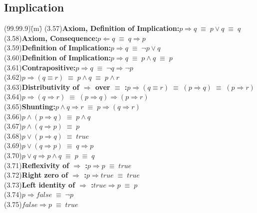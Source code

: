 \documentclass{amsart}
\newcommand{\lgap}{2pt}                             %
\newcommand{\equivs}{\ensuremath{\;\equiv\;}}       %
\newcommand{\impl}{\ensuremath{\Rightarrow}}        %
\newcommand{\foll}{\ensuremath{\Leftarrow}}         %
\begin{document}
\subsection*{Implication}
\begin{tabbing}
(99.99.9)\;\=(m)\;\=\kill
(3.57)\>\textbf{Axiom, Definition of Implication:}\quad $p\impl q \equivs p\lor q \equivs q$\\[\lgap]
(3.58)\>\textbf{Axiom, Consequence:}\quad $p\foll q \equivs q\impl p$\\[\lgap]
(3.59)\>\textbf{Definition of Implication:}\quad $p\impl q \equivs \neg p \lor q$\\[\lgap]
(3.60)\>\textbf{Definition of Implication:}\quad $p\impl q \equivs p\land q \equivs p$\\[\lgap]
(3.61)\>\textbf{Contrapositive:}\quad $p\impl q \equivs \neg q\impl \neg p$\\[\lgap]
(3.62)\>$p\impl (q\equiv r) \equivs p\land q\equivs p\land r$\\[\lgap]
(3.63)\>\textbf{Distributivity of $\impl$ over $\equiv$ :}\quad $p\impl (q\equiv r)\equivs (p\impl q)\equivs (p\impl r)$\\[\lgap]
(3.64)\>$p\impl (q\impl r) \equivs (p\impl q)\impl (p\impl r)$\\[\lgap]
(3.65)\>\textbf{Shunting:}\quad $p\land q\impl r\equivs p\impl (q\impl r)$\\[\lgap]
(3.66)\>$p\land (p\impl q) \equivs p\land q$\\[\lgap]
(3.67)\>$p\land (q\impl p) \equivs p$\\[\lgap]
(3.68)\>$p\lor (p\impl q) \equivs true$\\[\lgap]
(3.69)\>$p\lor (q\impl p) \equivs q\impl p$\\[\lgap]
(3.70)\>$p\lor q \impl p\land q \equivs p \equivs q$\\[\lgap]
(3.71)\>\textbf{Reflexivity of $\impl$ :}\quad $p\impl p \equivs true$\\[\lgap]
(3.72)\>\textbf{Right zero of $\impl$ :}\quad $p\impl true \equivs true$\\[\lgap]
(3.73)\>\textbf{Left identity of $\impl$ :}\quad $true\impl p \equivs p$\\[\lgap]
(3.74)\>$p\impl false \equivs \neg p$\\[\lgap]
(3.75)\>$false\impl p \equivs true$\\[\lgap]
\end{tabbing}
\newpage
\end{document}
